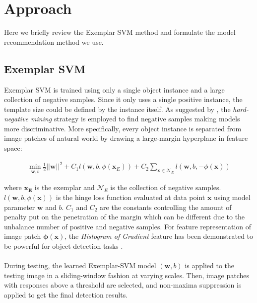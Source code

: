 \documentclass{article} %
\begin{document}
\section{Approach}
Here we briefly review the Exemplar SVM method and formulate the model recommendation method we use.

\subsection{Exemplar SVM}
\label{exemplarsvm}
Exemplar SVM is trained using only a single object instance and a large collection of negative samples. Since it only uses a single positive instance, the template size could be defined by the instance itself. As suggested by \cite{felzenszwalb2008discriminatively}, the \emph{hard-negative mining} strategy is employed to find negative samples making models more discriminative. More specifically, every object instance is separated from image patches of natural world by drawing a large-margin hyperplane in feature space:

\begin{equation}
\begin{aligned}
\min_{\mathbf{w},b}\frac{1}{2}||\mathbf{w}||^2+C_1l(\mathbf{w},b,\phi(\mathbf{x}_E))+C_2\sum_{\mathbf{x}{\in}\mathcal{N}_E}l(\mathbf{w},b,-\phi(\mathbf{x}))
\end{aligned}
\label{esvmformulation}
\end{equation}

where $\mathbf{x_E}$ is the exemplar and $\mathcal{N}_E$ is the collection of negative samples. $l(\mathbf{w},b,\phi(\mathbf{x}))$ is the hinge loss function evaluated at data point $\mathbf{x}$ using model parameter $\mathbf{w}$ and $b$. $C_1$ and $C_2$ are the constants controlling the amount of penalty put on the penetration of the margin which can be different due to the unbalance number of positive and negative samples. For feature representation of image patch $\mathbf{\phi(x)}$, the \emph{Histogram of Gradient} feature has been demonstrated to be powerful for object detection tasks \cite{dalal2005histograms,felzenszwalb2008discriminatively,malisiewicz2011ensemble}.\\\\
During testing, the learned Exemplar-SVM model $(\mathbf{w},b)$ is applied to the testing image in a sliding-window fashion at varying scales. Then, image patches with responses above a threshold are selected, and non-maxima suppression is applied to get the final detection results.
\end{document}
